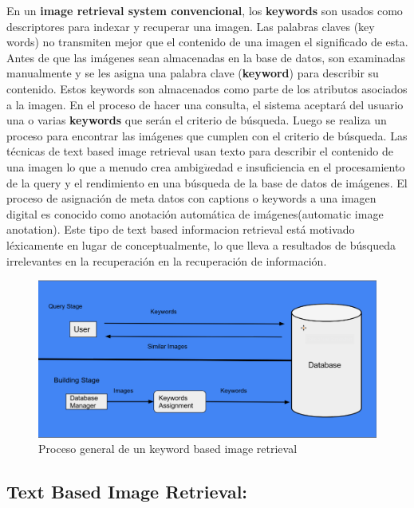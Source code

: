 \documentclass{llncs}
\begin{document}
En un \textbf{image retrieval system convencional}, los \textbf{keywords} son 
usados como descriptores para indexar y recuperar una imagen.  Las palabras 
claves (key words) no transmiten mejor que el contenido de una imagen 
el significado de esta. Antes de que las imágenes sean almacenadas en la base de datos, son examinadas 
manualmente y se les asigna una palabra  clave (\textbf{keyword}) para describir su 
contenido. Estos  keywords  son almacenados como parte de los atributos 
asociados a la imagen. En el proceso de hacer una consulta, el sistema 
aceptará del usuario una o varias \textbf{keywords} que serán el criterio de búsqueda.
Luego se realiza un proceso para encontrar las imágenes que cumplen con el criterio 
de búsqueda. Las t\'ecnicas de text based image retrieval usan texto para describir el 
contenido de una imagen lo que a menudo crea ambig$\ddot{u}$edad e insuficiencia en el 
procesamiento de la query y el rendimiento en una b\'usqueda de la base de datos de 
im\'agenes. El proceso de asignaci\'on de meta datos con captions o keywords a una imagen
digital es conocido como anotaci\'on autom\'atica de im\'agenes(automatic image anotation).
Este tipo de text based informacion retrieval est\'a motivado l\'exicamente en lugar de 
conceptualmente, lo que lleva a resultados de b\'usqueda irrelevantes en la recuperaci\'on en la 
recuperaci\'on de informaci\'on.
\\
\begin{figure}
    \caption{Proceso general de un keyword based image retrieval}
    \includegraphics[scale = .3]{./images/kbir-process.png}
\end{figure}





\subsection{Text Based Image Retrieval:}
\end{document}
